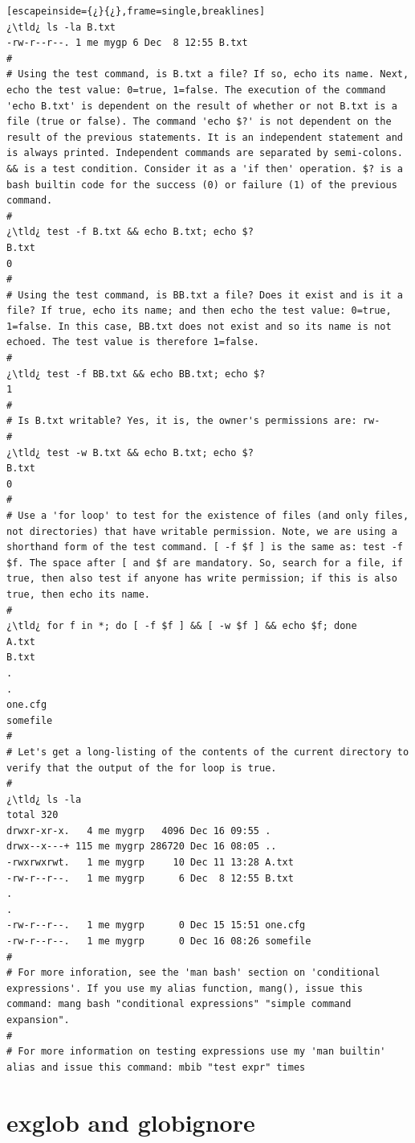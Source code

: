 \begin{lstlisting}[escapeinside={¿}{¿},frame=single,breaklines]
¿\tld¿ ls -la B.txt
-rw-r--r--. 1 me mygp 6 Dec  8 12:55 B.txt
#
# Using the test command, is B.txt a file? If so, echo its name. Next, echo the test value: 0=true, 1=false. The execution of the command 'echo B.txt' is dependent on the result of whether or not B.txt is a file (true or false). The command 'echo $?' is not dependent on the result of the previous statements. It is an independent statement and is always printed. Independent commands are separated by semi-colons. && is a test condition. Consider it as a 'if then' operation. $? is a bash builtin code for the success (0) or failure (1) of the previous command.
#
¿\tld¿ test -f B.txt && echo B.txt; echo $?
B.txt
0
#
# Using the test command, is BB.txt a file? Does it exist and is it a file? If true, echo its name; and then echo the test value: 0=true, 1=false. In this case, BB.txt does not exist and so its name is not echoed. The test value is therefore 1=false.
#
¿\tld¿ test -f BB.txt && echo BB.txt; echo $?
1
#
# Is B.txt writable? Yes, it is, the owner's permissions are: rw-
#
¿\tld¿ test -w B.txt && echo B.txt; echo $?
B.txt
0
#
# Use a 'for loop' to test for the existence of files (and only files, not directories) that have writable permission. Note, we are using a shorthand form of the test command. [ -f $f ] is the same as: test -f $f. The space after [ and $f are mandatory. So, search for a file, if true, then also test if anyone has write permission; if this is also true, then echo its name.
#
¿\tld¿ for f in *; do [ -f $f ] && [ -w $f ] && echo $f; done
A.txt
B.txt
.
.
one.cfg
somefile
#
# Let's get a long-listing of the contents of the current directory to verify that the output of the for loop is true.
#
¿\tld¿ ls -la
total 320
drwxr-xr-x.   4 me mygrp   4096 Dec 16 09:55 .
drwx--x---+ 115 me mygrp 286720 Dec 16 08:05 ..
-rwxrwxrwt.   1 me mygrp     10 Dec 11 13:28 A.txt
-rw-r--r--.   1 me mygrp      6 Dec  8 12:55 B.txt
.
.
-rw-r--r--.   1 me mygrp      0 Dec 15 15:51 one.cfg
-rw-r--r--.   1 me mygrp      0 Dec 16 08:26 somefile
#
# For more inforation, see the 'man bash' section on 'conditional expressions'. If you use my alias function, mang(), issue this command: mang bash "conditional expressions" "simple command expansion".
#
# For more information on testing expressions use my 'man builtin' alias and issue this command: mbib "test expr" times
\end{lstlisting}

\section{exglob and globignore}

